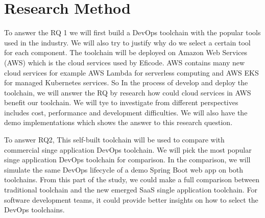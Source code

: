 \section{Research Method}
To answer the RQ 1 we will first build a DevOps toolchain with the popular tools used in the industry. We will also try to justify why do we select a certain tool for each component. The toolchain will be deployed on Amazon Web Services (AWS) which is the cloud services used by Eficode. AWS contains many new cloud services for example AWS Lambda for serverless computing and AWS EKS for managed Kubernetes services. 
So In the process of develop and deploy the toolchain, we will answer the RQ by research how could cloud services in AWS benefit our toolchain. We will tye to investigate from different perspectives includes cost, performance and development difficulties. We will also have the demo implementations which shows the answer to this research question.
\par
To answer RQ2, This self-built toolchain will be used to compare with commercial singe application DevOps toolchain. We will pick the most popular singe application DevOps toolchain for comparison. In the comparison, we will simulate the same DevOps lifecycle of a demo Spring Boot web app on both toolchains. 
From this part of the study, we could make a full comparison between traditional toolchain and the new emerged SaaS single application toolchain. For software development teams, it could provide better insights on how to select the DevOps toolchains.
